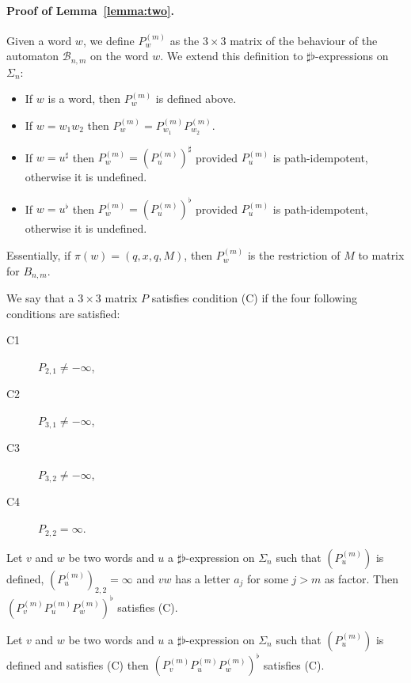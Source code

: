 \documentclass{lmcs}
\theoremstyle{remark}
\theoremstyle{remark}
\begin{document}
\paragraph{Proof of Lemma~\ref{lemma:two}.}
Given a word $w$, we define $P^{(m)}_w$ as the $3\times 3$ matrix of the behaviour of the automaton $\mathcal{B}_{n,m}$ on the word $w$. We extend this definition to $\sharp \flat$-expressions on $\Sigma_n$:
\begin{itemize}
\item If $w$ is a word, then $P^{(m)}_w$ is defined above.
\item If $w = w_1w_2$ then $P^{(m)}_w = P^{(m)}_{w_1}P^{(m)}_{w_2}$.
\item If $w = u^\sharp$ then $P^{(m)}_w = (P^{(m)}_{u})^\sharp$ provided $P^{(m)}_{u}$ is path-idempotent, otherwise it is undefined.
\item If $w = u^\flat$ then $P^{(m)}_w = (P^{(m)}_{u})^\flat$ provided $P^{(m)}_{u}$ is path-idempotent, otherwise it is undefined.
\end{itemize}
Essentially, if $\pi(w) = (q,x,q, M)$, then $P_w^{(m)}$ is the restriction of $M$ to matrix for $B_{n,m}$.


We say that a $3\times 3$ matrix $P$ satisfies condition (C) if the four following conditions are satisfied: 
\begin{description}
    
\item[C1] $P_{2,1} \neq -\infty$, 
\item[C2] $P_{3,1} \neq -\infty$,
\item[C3] $P_{3,2} \neq -\infty$,
\item[C4] $P_{2,2} = \infty$.
\end{description}

\begin{lem}
\label{lemma:twoA}
Let $v$ and $w$ be two words and $u$ a $\sharp \flat$-expression on $\Sigma_n$ such that $(P^{(m)}_u)$ is defined, $(P^{(m)}_u)_{2,2} = \infty$ and $vw$ has a letter $a_j$ for some $j>m$ as factor. 
Then $(P^{(m)}_v P^{(m)}_u P^{(m)}_w)^\flat$ satisfies (C).
\end{lem}

\begin{lem}
\label{lemma:twoB}
Let $v$ and $w$ be two words and $u$ a $\sharp \flat$-expression on $\Sigma_n$ such that $(P^{(m)}_u)$ is defined and satisfies (C) then $(P^{(m)}_v P^{(m)}_u P^{(m)}_w)^\flat$ satisfies (C).
\end{lem}
\end{document}
